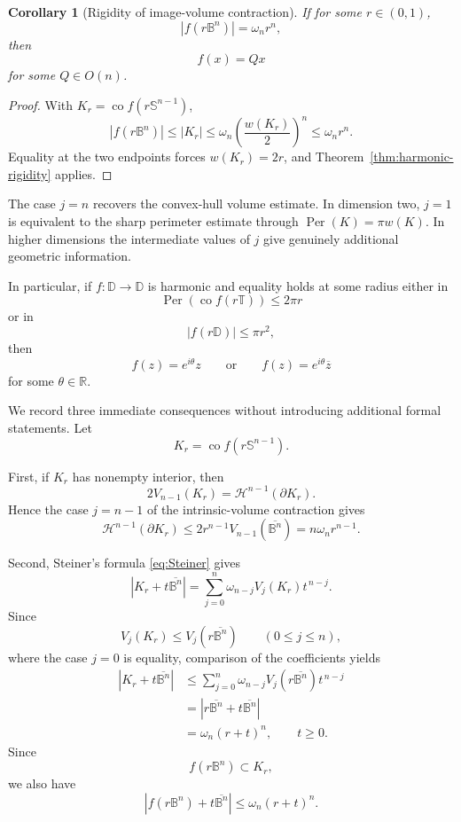 \documentclass[11pt,reqno]{amsart}
\newtheorem{corollary}[theorem]{Corollary}
\theoremstyle{remark}
\begin{document}
\begin{corollary}[Rigidity of image-volume contraction]
\label{cor:volume-rigidity}
If for some $r\in(0,1)$,
\[
 |f(r\mathbb B^n)|=\omega_nr^n,
\]
then
\[
 f(x)=Qx
\]
for some $Q\in O(n)$.
\end{corollary}

\begin{proof}
With $K_r=\operatorname{co}f(r\mathbb S^{n-1})$,
\[
 |f(r\mathbb B^n)|
 \le
 |K_r|
 \le
 \omega_n\left(\frac{w(K_r)}2\right)^n
 \le
 \omega_nr^n.
\]
Equality at the two endpoints forces $w(K_r)=2r$, and
Theorem~\ref{thm:harmonic-rigidity} applies.
\end{proof}

The case $j=n$ recovers the convex-hull volume estimate.  In dimension two,
$j=1$ is equivalent to the sharp perimeter estimate through
$\operatorname{Per}(K)=\pi w(K)$.  In higher dimensions the intermediate
values of $j$ give genuinely additional geometric information.

In particular, if $f:\mathbb D\to\mathbb D$ is harmonic and equality holds
at some radius either in
\[
 \operatorname{Per}\!\left(\operatorname{co}f(r\mathbb T)\right)\le2\pi r
\]
or in
\[
 |f(r\mathbb D)|\le\pi r^2,
\]
then
\[
 f(z)=e^{i\theta}z
 \qquad\text{or}\qquad
 f(z)=e^{i\theta}\overline z
\]
for some $\theta\in\mathbb R$.

We record three immediate consequences without introducing additional formal
statements.  Let
\[
K_r=\operatorname{co}f(r\mathbb S^{n-1}).
\]

First, if $K_r$ has nonempty interior, then
\[
2V_{n-1}(K_r)=\mathcal H^{n-1}(\partial K_r).
\]
Hence the case $j=n-1$ of the intrinsic-volume contraction gives
\[
\mathcal H^{n-1}(\partial K_r)
\le
2r^{n-1}V_{n-1}(\overline{\mathbb B^n})
=
n\omega_n r^{n-1}.
\]

Second, Steiner's formula \eqref{eq:Steiner} gives
\[
|K_r+t\overline{\mathbb B^n}|
=
\sum_{j=0}^n
\omega_{n-j}V_j(K_r)t^{\,n-j}.
\]
Since
\[
V_j(K_r)
\le
V_j(r\overline{\mathbb B^n})
\qquad (0\le j\le n),
\]
where the case $j=0$ is equality, comparison of the coefficients yields
\[
\begin{aligned}
|K_r+t\overline{\mathbb B^n}|
&\le
\sum_{j=0}^n
\omega_{n-j}
V_j(r\overline{\mathbb B^n})t^{\,n-j} \\
&=
|r\overline{\mathbb B^n}
+t\overline{\mathbb B^n}| \\
&=
\omega_n(r+t)^n ,
\qquad t\ge0.
\end{aligned}
\]
Since
\[
f(r\mathbb B^n)\subset K_r,
\]
we also have
\[
|f(r\mathbb B^n)+t\overline{\mathbb B^n}|
\le
\omega_n(r+t)^n.
\]
\end{document}
